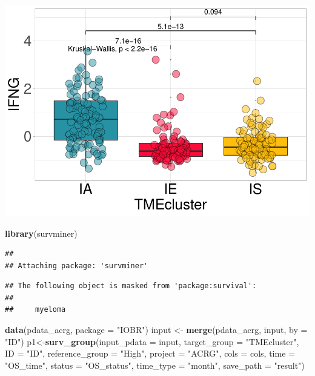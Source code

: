 \documentclass[
  12pt,
]{book}
\newenvironment{Shaded}{\begin{snugshade}}{\end{snugshade}}
\newcommand{\AttributeTok}[1]{\textcolor[rgb]{0.13,0.29,0.53}{#1}}
\newcommand{\FunctionTok}[1]{\textcolor[rgb]{0.13,0.29,0.53}{\textbf{#1}}}
\newcommand{\NormalTok}[1]{#1}
\newcommand{\OtherTok}[1]{\textcolor[rgb]{0.56,0.35,0.01}{#1}}
\newcommand{\StringTok}[1]{\textcolor[rgb]{0.31,0.60,0.02}{#1}}
\theoremstyle{definition}
\theoremstyle{definition}
\theoremstyle{definition}
\theoremstyle{definition}
\theoremstyle{remark}
\begin{document}
\includegraphics{_main_files/figure-latex/unnamed-chunk-24-1.pdf}

\begin{Shaded}
\begin{Highlighting}[]
\FunctionTok{library}\NormalTok{(survminer)}
\end{Highlighting}
\end{Shaded}

\begin{verbatim}
## 
## Attaching package: 'survminer'
\end{verbatim}

\begin{verbatim}
## The following object is masked from 'package:survival':
## 
##     myeloma
\end{verbatim}

\begin{Shaded}
\begin{Highlighting}[]
\FunctionTok{data}\NormalTok{(pdata\_acrg, }\AttributeTok{package =} \StringTok{"IOBR"}\NormalTok{)}
\NormalTok{input }\OtherTok{\textless{}{-}} \FunctionTok{merge}\NormalTok{(pdata\_acrg, input, }\AttributeTok{by =} \StringTok{"ID"}\NormalTok{)}
\NormalTok{p1}\OtherTok{\textless{}{-}}\FunctionTok{surv\_group}\NormalTok{(}\AttributeTok{input\_pdata       =}\NormalTok{ input,}
               \AttributeTok{target\_group      =} \StringTok{"TMEcluster"}\NormalTok{,}
               \AttributeTok{ID                =} \StringTok{"ID"}\NormalTok{,}
               \AttributeTok{reference\_group   =} \StringTok{"High"}\NormalTok{,}
               \AttributeTok{project           =} \StringTok{"ACRG"}\NormalTok{,}
               \AttributeTok{cols              =}\NormalTok{ cols, }
               \AttributeTok{time              =} \StringTok{"OS\_time"}\NormalTok{,}
               \AttributeTok{status            =} \StringTok{"OS\_status"}\NormalTok{,}
               \AttributeTok{time\_type         =} \StringTok{"month"}\NormalTok{,}
               \AttributeTok{save\_path         =} \StringTok{"result"}\NormalTok{)}
\end{Highlighting}
\end{Shaded}
\end{document}
